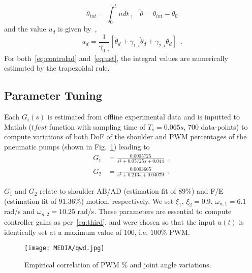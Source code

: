 \documentclass[letterpaper, 10pt, conference]{ieeeconf}      %
\begin{document}
\begin{equation}
        \theta_{int} = \int_{0}^{t} u dt~,~~~~
        \dot{\theta} = \theta_{int} -\dot{\theta}_0
            \label{eq:ust}
\end{equation}
%
and the value $u_d$ is given by~\cite{sira2007fast}, 
%
\begin{equation}
    u_d = \frac{1}{\gamma_{0,i}}[\ddot{\theta}_d + \gamma_{1,i}\dot{\theta}_d+\gamma_{2,i}\theta_d]\enspace.
\end{equation}
%
For both~\eqref{eq:controlad} and~\eqref{eq:ust}, the integral values are numerically estimated by the trapezoidal rule. 

\subsection{Parameter Tuning}

Each $G_i(s)$ is estimated from offline experimental data and is inputted to Matlab ($tfest$ function with sampling time of $T_s=0.065s$, 700 data-points) to compute variations of both DoF of the shoulder and PWM percentages of the pneumatic pumps (shown in Fig.~\ref{fig:datap}) leading to
%
   \begin{equation}
   \begin{aligned}
     G_1 &= \frac{0.0005725}{s^2+0.05725s+0.044}\enspace, \\
    G_2 &= \frac{0.0003665}{s^2+0.213s+0.04079}\enspace.
   \label{eq:tf}
   \end{aligned}
 \end{equation}

$G_1$ and $G_2$ relate to shoulder AB/AD (estimation fit of $89\%$) and F/E (estimation fit of $91.36\%$) motion, respectively. We set $\xi_1$, $\xi_2 = 0.9$, $\omega_{n,1}=6.1$ \;rad/s and $\omega_{n,2}=10.25$ \;rad/s. These parameters are essential to compute controller gains as per~\eqref{eq:third}, and were chosen so that the input $u(t)$ is identically set at a maximum value of $100$, i.e. $100\%$ PWM.

\begin{figure}[!t]
   \vspace{5pt}
   \centering
     \texttt{[image: MEDIA/qwd.jpg]}
      \vspace{-9pt}
      \caption{Empirical correlation of PWM \% and joint angle variations. %
      }
      \label{fig:datap}
      \vspace{-9pt}
\end{figure}
   
\end{document}

